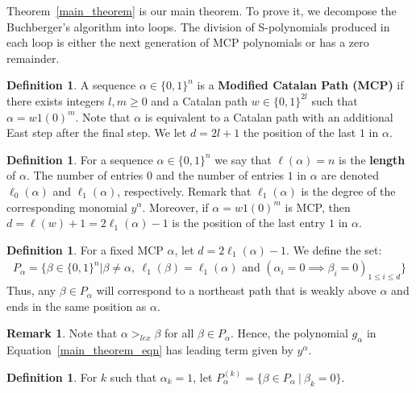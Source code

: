 \documentclass[12pt,reqno]{amsart}
\theoremstyle{plain}
\theoremstyle{definition}
\newtheorem{remark}[theorem]{Remark}
\newtheorem{definition}[theorem]{Definition}
\begin{document}
Theorem~\ref{main_theorem} is our main theorem. To prove it, we decompose the Buchberger's algorithm into loops. The division of S-polynomials produced in each loop is either the next generation of MCP polynomials  or has a zero remainder.
\begin{definition}  \label{MCP}
	A sequence  $\alpha \in \{0,1\}^n$ is a {\bf Modified Catalan Path (MCP)} if there exists integers $l,m\ge 0$ and a Catalan path $w \in \{0,1\}^{2l}$ such that $\alpha = w1(0)^m$.
	Note that $\alpha$ is equivalent to a Catalan path with an additional East step after the final step. We let $d=2l+1$ the position of the last $1$ in $\alpha$.
\end{definition}
\begin{definition}  \label{pathlength}
	For a sequence $\alpha \in \{0,1\}^n$ we say that $\ell(\alpha)=n$ is the {\bf length} of $\alpha$. The number of entries  $0$ and the number of entries  $1$ in $\alpha$ are denoted $	\ell_0(\alpha)$ and $\ell_1(\alpha)$, respectively. Remark that $\ell_1(\alpha)$ is the degree of the corresponding monomial $y^{\alpha}$. Moreover, if $\alpha= w1(0)^m$ is MCP, then 
	$d = \ell(w)+1 =2\ell_1(\alpha)-1$ is the position of the last entry $1$ in $\alpha$.
\end{definition} 
\begin{definition} \label{p_alpha}
	For a fixed MCP $\alpha$, let $d=2\ell_1(\alpha)-1$. We define the set:
	\begin{align*}
		P_{\alpha} = \big\{ \beta \in \{0,1\}^n \big| \beta \neq \alpha,\  \ell_1(\beta)=\ell_1(\alpha) \text{ and } (\alpha_i = 0 \implies \beta_i = 0)_{1 \leq i \leq d}\big\}
	\end{align*}
	Thus, any $\beta \in P_\alpha$ will correspond to a northeast path that is weakly above $\alpha$ and ends in the same position as $\alpha$.
\end{definition}
\begin{remark}\label{rem:lex}
	Note that $\alpha >_{lex} \beta$ for all  $ \beta \in P_{\alpha}$. Hence, the polynomial $g_\alpha$ in Equation~\eqref{main_theorem_eqn} has leading term given by $y^\alpha$.
\end{remark}
\begin{definition} \label{p_alpha_k}
	For $k$ such that $\alpha_k=1$, let
		$P_\alpha^{(k)} = \big\{\beta  \in P_\alpha \ | \ \beta_k = 0\big\}.$
\end{definition}
\end{document}
